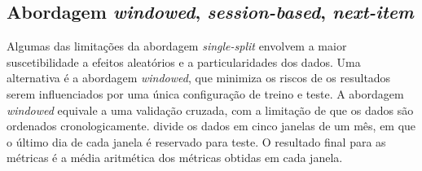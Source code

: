 \subsection{Abordagem \textit{windowed}, \textit{session-based}, \textit{next-item}}
Algumas das limitações da abordagem \textit{single-split} envolvem a maior
suscetibilidade a efeitos aleatórios e a particularidades dos dados. Uma
alternativa é a abordagem \textit{windowed}, que minimiza os riscos de os
resultados serem influenciados por uma única configuração de treino e teste. A
abordagem \textit{windowed} equivale a uma validação cruzada, com a limitação de
que os dados são ordenados cronologicamente. \citet{ludewig_2018} divide os
dados em cinco janelas de um mês, em que o último dia de cada janela é reservado
para teste. O resultado final para as métricas é a média aritmética dos
métricas obtidas em cada janela.


